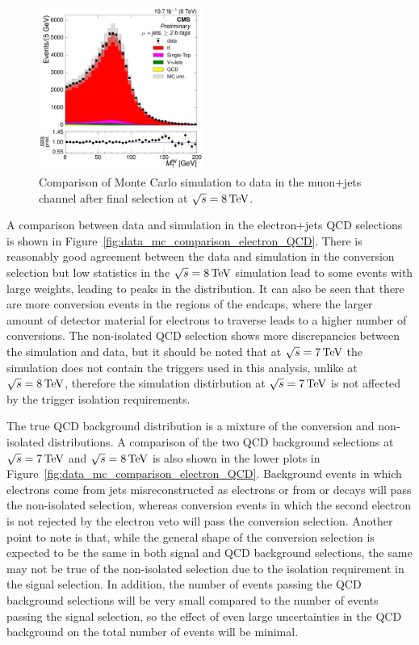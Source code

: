 \begin{figure}[hbtp]
     \includegraphics[width=0.48\textwidth]{Chapters/04_Analysis/04b_XSections/images/control_plots/before_fit/8TeV/MuPlusJets_patType1CorrectedPFMet_MT_2orMoreBtags_with_ratio.pdf}\hfill
     \caption{Comparison of Monte Carlo simulation to data in the muon+jets channel after final
     selection at $\sqrt{s}=8\,\text{Te\hspace{-.08em}V}$.}
     \label{fig:data_mc_comparison_8TeV_muon}
\end{figure}
\FloatBarrier

A comparison between data and simulation in the electron+jets QCD selections is shown in
Figure~\ref{fig:data_mc_comparison_electron_QCD}. There is reasonably good agreement between the data and
simulation in the conversion selection but low statistics in the $\sqrt{s}=8\,\text{Te\hspace{-.08em}V}$ simulation lead to some
events with large weights, leading to peaks in the distribution. It can also be seen that there are more
conversion events in the regions of the endcaps, where the larger amount of detector material for electrons to
traverse leads to a higher number of conversions. The non-isolated QCD selection shows more discrepancies
between the simulation and data, but it should be noted that at $\sqrt{s}=7\,\text{Te\hspace{-.08em}V}$ the simulation does not
contain the triggers used in this analysis, unlike at $\sqrt{s}=8\,\text{Te\hspace{-.08em}V}$, therefore the simulation distirbution
at $\sqrt{s}=7\,\text{Te\hspace{-.08em}V}$ is not affected by the trigger isolation requirements.

The true QCD background distribution is a mixture of the conversion and non-isolated distributions. A
comparison of the two QCD background selections at $\sqrt{s}=7\,\text{Te\hspace{-.08em}V}$ and $\sqrt{s}=8\,\text{Te\hspace{-.08em}V}$ is also shown in the
lower plots in Figure~\ref{fig:data_mc_comparison_electron_QCD}. Background events in which electrons come
from jets misreconstructed as electrons or from \bquark or \cquark decays will pass the non-isolated
selection, whereas conversion events in which the second electron is not rejected by the electron veto will
pass the conversion selection. Another point to note is that, while the general shape of the conversion
selection is expected to be the same in both signal and QCD background selections, the same may not be true of
the non-isolated selection due to the isolation requirement in the signal selection. In addition, the number
of events passing the QCD background selections will be very small compared to the number of events passing
the signal selection, so the effect of even large uncertainties in the QCD background on the total number of
events will be minimal.

